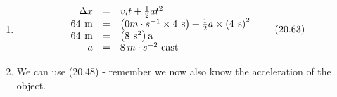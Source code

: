 {\begin{mdframed}[linewidth=4, leftmargin=40, rightmargin=40]
\begin{exercise}
\begin{enumerate}[noitemsep, label=\textbf{Step} \textbf{\arabic*}. ]
    \begin{equation}
    \Delta x={v}_{i}t+\frac{1}{2}a{t}^{2}\tag{20.62}
      \end{equation}
          \item  
          \label{m38796*id78590}\nopagebreak\noindent{}
    \begin{equation}
    \begin{array}{ccc}\hfill \Delta x& =& {v}_{i}t+\frac{1}{2}a{t}^{2}\hfill \\ \hfill 64\phantom{\rule{4pt}{0ex}}\mathrm{m}& =& \left(0m\ensuremath{\cdot}{s}^{-1}\ensuremath{\times}4\phantom{\rule{4pt}{0ex}}\mathrm{s}\right)+\frac{1}{2}a\ensuremath{\times}{\left(4\phantom{\rule{4pt}{0ex}}\mathrm{s}\right)}^{2}\hfill \\ \hfill 64\phantom{\rule{4pt}{0ex}}\mathrm{m}& =& \left(8\phantom{\rule{4pt}{0ex}}{\mathrm{s}}^{2}\right)\mathrm{a}\hfill \\ \hfill a& =& 8\phantom{\rule{2pt}{0ex}}m\ensuremath{\cdot}{s}^{-2}\phantom{\rule{3.33333pt}{0ex}}\mathrm{east}\hfill \end{array}\tag{20.63}
      \end{equation}
          \item  
          \label{m38796*id78832}We can use (20.48) - remember we now also know the acceleration of the object.\par 
          \label{m38796*id78840}\nopagebreak\noindent{}
            

\end{enumerate}
\end{exercise}
\end{mdframed}}
